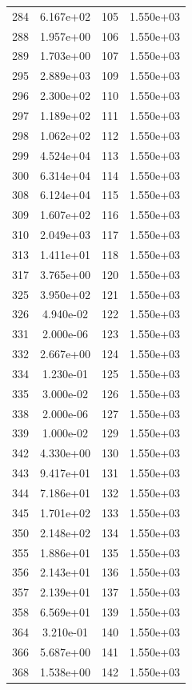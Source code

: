 \documentclass[12pt]{article}
\begin{document}
\begin{longtable}{@{}cccc@{}}
284 & 6.167e+02 & 105 & 1.550e+03 \\
288 & 1.957e+00 & 106 & 1.550e+03 \\
289 & 1.703e+00 & 107 & 1.550e+03 \\
295 & 2.889e+03 & 109 & 1.550e+03 \\
296 & 2.300e+02 & 110 & 1.550e+03 \\
297 & 1.189e+02 & 111 & 1.550e+03 \\
298 & 1.062e+02 & 112 & 1.550e+03 \\
299 & 4.524e+04 & 113 & 1.550e+03 \\
300 & 6.314e+04 & 114 & 1.550e+03 \\
308 & 6.124e+04 & 115 & 1.550e+03 \\
309 & 1.607e+02 & 116 & 1.550e+03 \\
310 & 2.049e+03 & 117 & 1.550e+03 \\
313 & 1.411e+01 & 118 & 1.550e+03 \\
317 & 3.765e+00 & 120 & 1.550e+03 \\
325 & 3.950e+02 & 121 & 1.550e+03 \\
326 & 4.940e-02 & 122 & 1.550e+03 \\
331 & 2.000e-06 & 123 & 1.550e+03 \\
332 & 2.667e+00 & 124 & 1.550e+03 \\
334 & 1.230e-01 & 125 & 1.550e+03 \\
335 & 3.000e-02 & 126 & 1.550e+03 \\
338 & 2.000e-06 & 127 & 1.550e+03 \\
339 & 1.000e-02 & 129 & 1.550e+03 \\
342 & 4.330e+00 & 130 & 1.550e+03 \\
343 & 9.417e+01 & 131 & 1.550e+03 \\
344 & 7.186e+01 & 132 & 1.550e+03 \\
345 & 1.701e+02 & 133 & 1.550e+03 \\
350 & 2.148e+02 & 134 & 1.550e+03 \\
355 & 1.886e+01 & 135 & 1.550e+03 \\
356 & 2.143e+01 & 136 & 1.550e+03 \\
357 & 2.139e+01 & 137 & 1.550e+03 \\
358 & 6.569e+01 & 139 & 1.550e+03 \\
364 & 3.210e-01 & 140 & 1.550e+03 \\
366 & 5.687e+00 & 141 & 1.550e+03 \\
368 & 1.538e+00 & 142 & 1.550e+03 \\

\end{longtable}
\end{document}
